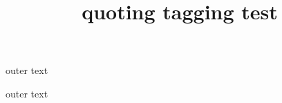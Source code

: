 \documentclass{article}
\title{quoting tagging test}
\begin{document}
outer text
\begin{quoting}
\kant[1-2]
\end{quoting}

outer text
\end{document}
